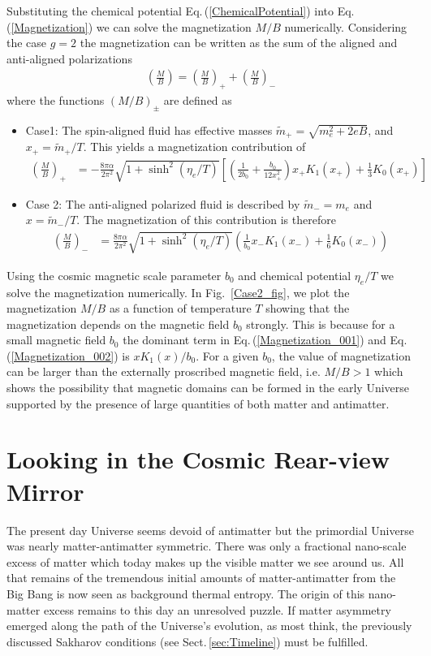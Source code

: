 \documentclass[universe,article,submit,moreauthors,pdftex,a4paper]{Definitions/mdpi}
\newcommand{\req}[1]{Eq.\,(\ref{#1})}
\newcommand*{\rf}[1]{Fig.~{\ref{#1}}}
\newcommand*{\rsec}[1]{Sect.\,{\ref{#1}}}
\newcommand*{\xblue}{\color{blue}}
\begin{document}
Substituting the chemical potential \req{ChemicalPotential} into \req{Magnetization} we can solve the magnetization $M/B$ numerically.
Considering the case $g=2$ the magnetization can be written as the sum of the aligned and anti-aligned polarizations
\begin{align}
\left(\frac{M}{B}\right)=\left(\frac{M}{B}\right)_++\left(\frac{M}{B}\right)_-
\end{align}
where the functions $(M/B)_\pm$ are defined as 
\begin{itemize}
 \item Case1: The spin-aligned fluid has effective masses $\tilde m_+=\sqrt{m^2_e+2eB}$, and $x_+=\tilde m_+/T$. This yields a magnetization contribution of
\begin{align}\label{Magnetization_001}
 \left(\frac{M}{B}\right)_+&=-\frac{8\pi\alpha}{2\pi^2}\sqrt{1+\sinh^2(\eta_e/T)}\left[\left(\frac{1}{2b_0}+\frac{b_0}{12x_+^2}\right)x_+K_1(x_+)+\frac{1}{3}K_0(x_+)\right]
\end{align}
 \item Case 2: The anti-aligned polarized fluid is described by $\tilde m_-=m_e$ and $x=\tilde m_-/T$. The magnetization of this contribution is therefore
\begin{align}\label{Magnetization_002}
\left(\frac{M}{B}\right)_-&=\frac{8\pi\alpha}{2\pi^2}\sqrt{1+\sinh^2(\eta_e/T)}\left(\frac{1}{b_0}x_-K_1(x_-)+\frac{1}{6}K_0(x_-)\right)
\end{align}
\end{itemize}
Using the cosmic magnetic scale parameter $b_0$ and chemical potential $\eta_e/T$ we solve the magnetization numerically. In \rf{Case2_fig}, we plot the magnetization $M/B$ as a function of temperature $T$ showing that the magnetization depends on the magnetic field $b_0$ strongly. This is because for a small magnetic field $b_0$ the dominant term in \req{Magnetization_001} and \req{Magnetization_002} is $xK_1(x)/b_0$. For a given $b_0$, the value of magnetization can be larger than the externally proscribed magnetic field, i.e. $M/B>1$ which shows the possibility that magnetic domains can be formed in the early Universe {\xblue supported by the presence of large quantities of both matter and antimatter.}

\section{Looking in the Cosmic Rear-view Mirror}\label{sec:Summary}
\noindent The present day Universe seems devoid of antimatter but the primordial Universe was nearly matter-antimatter symmetric. There was only a fractional nano-scale excess of matter which today makes up the visible matter we see around us. All that remains of the tremendous initial amounts of matter-antimatter from the Big Bang is now seen as background thermal entropy. The origin of this nano-matter excess remains to this day an unresolved puzzle. If matter asymmetry emerged along the path of the Universe's evolution, as most think, the previously discussed Sakharov conditions (see \rsec{sec:Timeline}) must be fulfilled.
\end{document}
